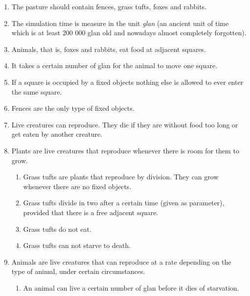 \documentclass[12pt]{article}
\begin{document}
\begin{enumerate}
\item The pasture should contain fences, grass tufts, foxes and rabbits.

\item The simulation time is measure in the unit \emph{glan} (an ancient unit of time which is at least 200 000 glan old and nowadays almost completely forgotten).

\item Animals, that is, foxes and rabbits, eat food at adjacent squares.

\item It takes a certain number of glan for the animal to move one square.

\item If a square is occupied by a fixed objects nothing else is allowed to ever enter the same square.

\item Fences are the only type of fixed objects.

\item Live creatures can reproduce. They die if they are without food too long or get eaten by another creature.

\item Plants are live creatures that reproduce whenever there is room for them to grow.

  \begin{enumerate}
  \item Grass tufts are plants that reproduce by division. They can grow whenever there are no fixed objects.

  \item Grass tufts divide in two after a certain time (given as parameter), provided that there is a free adjacent square.

  \item Grass tufts do not eat.

  \item Grass tufts can not starve to death.
  \end{enumerate}

\item Animals are live creatures that can reproduce at a rate depending on the type of animal, under certain circumstances.

  \begin{enumerate}
  \item An animal can live a certain number of glan before it dies of starvation.


\end{enumerate}
\end{enumerate}
\end{document}
